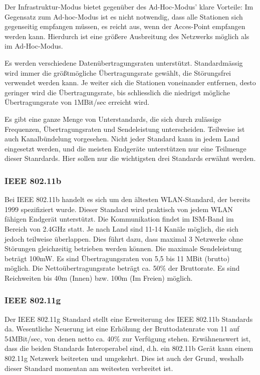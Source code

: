             Der Infrastruktur-Modus bietet gegenüber des Ad-Hoc-Modus' klare Vorteile: Im Gegensatz
            zum Ad-hoc-Modus ist es nicht notwendig, dass alle Stationen sich gegenseitig empfangen
            müssen, es reicht aus, wenn der Acces-Point empfangen werden kann. Hierdurch ist eine
            größere Ausbreitung des Netzwerks möglich als im Ad-Hoc-Modus. 

            Es werden verschiedene Datenübertragungsraten unterstützt. Standardmässig wird
            immer die größtmögliche Übertragungsrate gewählt, die Störungsfrei verwendet
            werden kann. Je weiter sich die Stationen voneinander entfernen, desto geringer
            wird die Übertragungsrate, bis schliesslich die niedrigst mögliche Übertragungsrate von
            1MBit/sec erreicht wird.

            Es gibt eine ganze Menge von Unterstandards, die sich durch zulässige Frequenzen, 
            Übertragungsraten und Sendeleistung unterscheiden. Teilweise ist auch Kanalbündelung 
            vorgesehen. Nicht jeder Standard kann in jedem Land eingesetzt werden, und die meisten
            Endgeräte unterstützen nur eine Teilmenge dieser Stanrdards. Hier sollen nur die
            wichtigsten drei Standards erwähnt werden.

        \subsubsection{IEEE 802.11b}
            Bei IEEE 802.11b handelt es sich um den ältesten WLAN-Standard, der bereits 1999 
            spezifiziert wurde. Dieser Standard wird praktisch von jedem WLAN fähigen 
            Endgerät unterstützt. Die Kommunikation findet im ISM-Band im Bereich von 2.4GHz
            statt. Je nach Land sind 11-14 Kanäle möglich, die sich jedoch teilweise überlappen.
            Dies führt dazu, dass maximal 3 Netzwerke ohne Störungen gleichzeitig betrieben werden
            können. Die maximale Sendeleistung beträgt 100mW. Es sind Übertragungsraten von 
            5,5 bis 11 MBit (brutto) möglich. Die Nettoübertragungsrate beträgt ca. 50\% der
            Bruttorate. Es sind Reichweiten bis 40m (Innen) bzw. 100m (Im Freien) möglich\cite{WirelessNetworking}.

        \subsubsection{IEEE 802.11g}
            Der IEEE 802.11g Standard stellt eine Erweiterung des IEEE 802.11b Standards da.
            Wesentliche Neuerung ist eine Erhöhung der Bruttodatenrate von 11 auf 54MBit/sec,
            von denen netto ca. 40\% zur Verfügung stehen. Erwähnenswert ist, dass die
            beiden Standards Interoperabel sind, d.h. ein 802.11b Gerät kann einem
            802.11g Netzwerk beitreten und umgekehrt. Dies ist auch der Grund, weshalb
            dieser Standard momentan am weitesten verbreitet ist.

